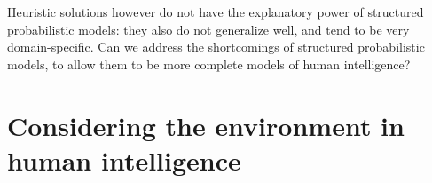 Heuristic solutions however do not have the explanatory power of structured probabilistic models: they also do not generalize well, and tend to be very domain-specific. Can we address the shortcomings of structured probabilistic models, to allow them to be more complete models of human intelligence?




\section*{Considering the environment in human intelligence}

